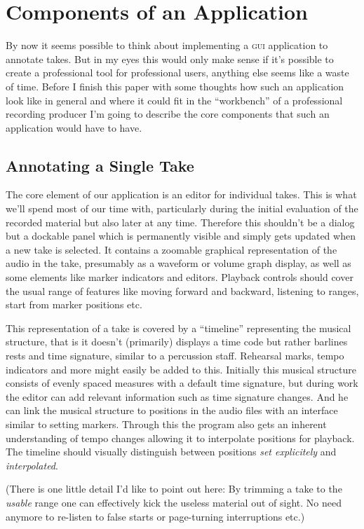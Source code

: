 \documentclass[11pt,a4paper]{article}
\begin{document}
\section{Components of an Application}

By now it seems possible to think about implementing a \textsc{gui} application to annotate takes.
But in my eyes this would only make sense if it's possible to create a professional tool for professional users, anything else seems like a waste of time.
Before I finish this paper with some thoughts how such an application look like in general and where it could fit in the “workbench” of a professional recording producer I'm going to describe the core components that such an application would have to have.

\subsection{Annotating a Single Take}
The core element of our application is an editor for individual takes.
This is what we'll spend most of our time with, particularly during the initial evaluation of the recorded material but also later at any time.
Therefore this shouldn't be a dialog but a dockable panel which is permanently visible and simply gets updated when a new take is selected.
It contains a zoomable graphical representation of the audio in the take, presumably as a waveform or volume graph display, as well as some elements like marker indicators and editors.
Playback controls should cover the usual range of features like moving forward and backward, listening to ranges, start from marker positions etc.

This representation of a take is covered by a “timeline” representing the musical structure, that is it doesn't (primarily) displays a time code but rather barlines rests and time signature, similar to a percussion staff.
Rehearsal marks, tempo indicators and more might easily be added to this.
Initially this musical structure consists of evenly spaced measures with a default time signature, but during work the editor can add relevant information such as time signature changes.
And he can link the musical structure to positions in the audio files with an interface similar to setting markers.
Through this the program also gets an inherent understanding of tempo changes allowing it to interpolate positions for playback.
The timeline should visually distinguish between positions \emph{set explicitely} and \emph{interpolated}.

(There is one little detail I'd like to point out here: By trimming a take to the \emph{usable} range one can effectively kick the useless material out of sight.
No need anymore to re-listen to false starts or page-turning interruptions etc.)
\end{document}
